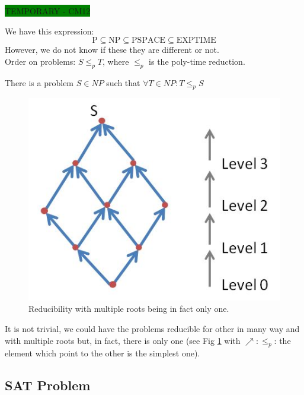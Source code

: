 \colorbox{green}{TEMPORARY - CM12}

We have this expression:
$$ \text{P} \subseteq \text{NP} \subseteq \text{PSPACE} \subseteq \text{EXPTIME}$$
However, we do not know if these they are different or not.\\
Order on problems: $S \leq_p T$, where $\leq_p$ is the poly-time reduction.\\

\begin{theorem} 
There is a problem $S \in NP$ such that $\forall T \in NP: T \leq_p S$ 
\end{theorem} 

\begin{figure}[h!]
\centering
\includegraphics[scale=0.5]{images/fig_1.jpg}
\caption{Reducibility with multiple roots being in fact only one.}
\label{c12:reducibility}
\end{figure}

It is not trivial, we could have the problems reducible for other in many way and
with multiple roots but, in fact, there is only one (see Fig \ref{c12:reducibility} with $\nearrow : \leq_p$: the element which point to the other is the simplest one).

\subsection{SAT Problem}

